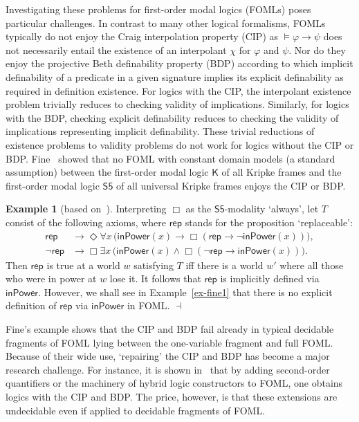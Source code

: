 \documentclass[10pt,a4paper]{amsart}
\theoremstyle{plain}
\theoremstyle{definition}
\newtheorem{exa}[thm]{Example}
\begin{document}
%
Investigating these problems for first-order modal logics (FOMLs) poses particular challenges. In contrast to many other logical formalisms, FOMLs typically do not enjoy the Craig interpolation property (CIP) as $\models \varphi \rightarrow \psi$ does not necessarily entail the existence of an interpolant $\chi$ for $\varphi$ and $\psi$. Nor do they enjoy the projective Beth definability property (BDP) according to which implicit definability of a predicate in a given signature  implies its explicit definability as required in definition existence. For logics with the CIP, 
the interpolant existence problem trivially reduces to checking validity of implications. Similarly, for logics with the BDP, checking explicit definability reduces to checking the validity of implications representing implicit definability. These trivial reductions of existence problems to validity problems do not work for logics without the CIP or BDP. 
Fine~\cite{DBLP:journals/jsyml/Fine79} showed that no FOML with constant domain models (a standard assumption) between the first-order modal logic $\mathsf{K}$ of all Kripke frames and the first-order modal logic $\mathsf{S5}$ of all universal Kripke frames enjoys the CIP or BDP.

\begin{exa}[based on~\cite{DBLP:journals/jsyml/Fine79}]\label{Ex:Fine}
Interpreting $\Box$ as the $\mathsf{S5}$-modality `always'\!, let $T$ consist of the following axioms, where $\mathsf{rep}$ stands for the proposition `replaceable':
%
\begin{align*}
\mathsf{rep} &\rightarrow \Diamond \forall x\, \big(\mathsf{inPower}(x) \rightarrow \Box (\mathsf{rep} \rightarrow \neg \mathsf{inPower}(x)) \big),\\
\neg \mathsf{rep} &\rightarrow \Box \exists x\, \big( \mathsf{inPower}(x) \wedge \Box (\neg \mathsf{rep} \rightarrow \mathsf{inPower}(x)) \big).
\end{align*}
%
Then $\mathsf{rep}$ is true at a world $w$ satisfying $T$ iff there is a world $w'$ where all those who were in power at $w$ lose it. It follows that $\mathsf{rep}$ is implicitly defined via $\mathsf{inPower}$. However, we shall see in Example~\ref{ex-fine1} that there is no explicit definition of $\mathsf{rep}$ 
via $\mathsf{inPower}$ in FOML.  \hfill $\dashv$
\end{exa}

Fine's example shows that the CIP and BDP fail already in typical decidable fragments of FOML lying between the one-variable fragment and full FOML.  Because of their wide use, `repairing' the CIP and BDP has become a major research challenge. For instance, it is shown in~\cite{DBLP:journals/jsyml/Fitting02,DBLP:journals/apal/ArecesBM03} that by adding second-order quantifiers or the machinery of hybrid logic constructors to FOML, one obtains logics with the CIP and BDP. The price, however, is that these extensions are undecidable even if applied to decidable fragments of FOML.  
\end{document}
